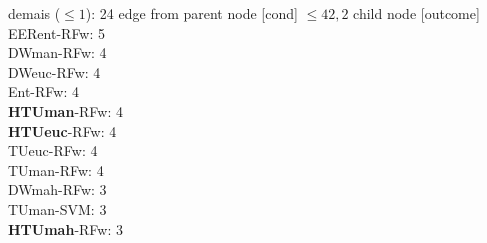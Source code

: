 {{{{%
demais ($\leq 1$): 24} edge from parent node [cond] {$\leq42,2$}}
child {node [outcome] {
EERent-RFw: 5\\
DWman-RFw: 4\\
DWeuc-RFw: 4\\
Ent-RFw: 4\\
\textbf{HTUman}-RFw: 4\\
\textbf{HTUeuc}-RFw: 4\\
TUeuc-RFw: 4\\
TUman-RFw: 4\\
DWmah-RFw: 3\\
TUman-SVM: 3\\
\textbf{HTUmah}-RFw: 3\\
}}}}

